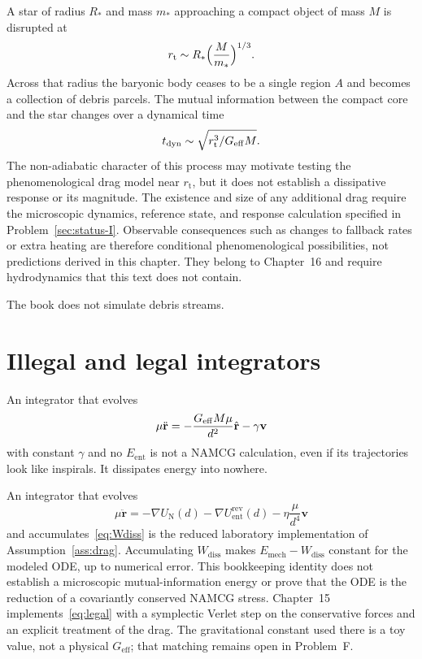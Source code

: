 A star of radius \(R_*\) and mass \(m_*\) approaching a compact
object of mass \(M\) is disrupted at
\begin{equation}
  \label{eq:tidal-radius}
  r_{\mathrm{t}}
  \sim R_*\Bigl(\frac{M}{m_*}\Bigr)^{1/3}.
\end{equation}
Across that radius the baryonic body ceases to be a single region
\(A\) and becomes a collection of debris parcels. The mutual
information between the compact core and the star changes over a
dynamical time
\begin{equation}
  \label{eq:tdyn}
  t_{\mathrm{dyn}}
  \sim\sqrt{r_{\mathrm{t}}^3/G_{\mathrm{eff}} M}.
\end{equation}
The non-adiabatic character of this process may motivate testing
the phenomenological drag model near \(r_{\mathrm t}\), but it
does not establish a dissipative response or its magnitude. The
existence and size of any additional drag require the microscopic
dynamics, reference state, and response calculation specified in
Problem~\ref{sec:status-I}. Observable consequences such as
changes to fallback rates or extra heating are therefore
conditional phenomenological possibilities, not predictions
derived in this chapter. They belong to Chapter~16
and require hydrodynamics that this text does not contain.

The book does not simulate debris streams.

\section{Illegal and legal integrators}
\label{sec:ch14-legal}

An integrator that evolves
\begin{equation}
  \label{eq:illegal}
  \mu\ddot{\mathbf{r}}
  =-\frac{G_{\mathrm{eff}} M\mu}{d^2}\hat{\mathbf{r}}
   -\gamma\mathbf{v}
\end{equation}
with constant \(\gamma\) and no \(E_{\mathrm{ent}}\) is not a
NAMCG calculation, even if its trajectories look like inspirals.
It dissipates energy into nowhere.

An integrator that evolves
\begin{equation}
  \label{eq:legal}
  \mu\ddot{\mathbf{r}}
  =-\nabla U_{\mathrm{N}}(d)
   -\nabla U_{\mathrm{ent}}^{\mathrm{rev}}(d)
   -\eta\frac{\mu}{d^4}\mathbf{v}
\end{equation}
and accumulates~\eqref{eq:Wdiss} is the reduced laboratory
implementation of Assumption~\ref{ass:drag}. Accumulating
\(W_{\mathrm{diss}}\) makes
\(E_{\mathrm{mech}}-W_{\mathrm{diss}}\) constant for the modeled
ODE, up to numerical error. This bookkeeping identity does not
establish a microscopic mutual-information energy or prove that
the ODE is the reduction of a covariantly conserved NAMCG stress.
Chapter~15 implements~\eqref{eq:legal}
with a symplectic Verlet step on the conservative forces and an
explicit treatment of the drag. The gravitational constant used
there is a toy value, not a physical \(G_{\mathrm{eff}}\); that
matching remains open in Problem~F.

